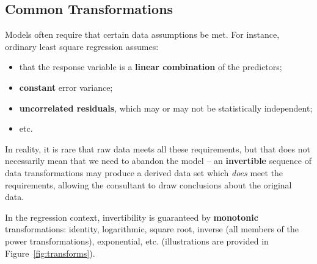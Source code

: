 \subsection{Common Transformations} Models often require that certain data assumptions be met. For instance, ordinary least square regression assumes:
\begin{itemize}[noitemsep]
\item that the response variable is a \textbf{linear combination} of the predictors;
\item \textbf{constant} error variance; 
\item \textbf{uncorrelated residuals}, which may or may not be statistically independent;
\item etc.
\end{itemize}
In reality, it is rare that raw data  meets all these requirements, but that does not necessarily mean that we need to abandon the model -- an \textbf{invertible} sequence of data transformations may produce a derived data set which \textit{does} meet the requirements, allowing the consultant to draw conclusions about the original data. \par In the regression context, invertibility is guaranteed by \textbf{monotonic} transformations:  identity, logarithmic, square root, inverse (all members of the power transformations), exponential, etc. (illustrations are provided in Figure~\ref{fig:transforms}).
